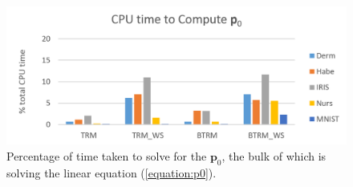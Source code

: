 \documentclass[letterpaper,12pt,titlepage,oneside,final]{book}
\begin{document}
\begin{figure}
	\centering
	\includegraphics[width=\textwidth]{images/CPU_time_p0}
	\caption{Percentage of time taken to solve for the $\mathbf{p}_{0}$, the bulk of which is solving the linear equation (\ref{equation:p0}).}
	\label{figure:p0_time}
\end{figure}
	
\end{document}
